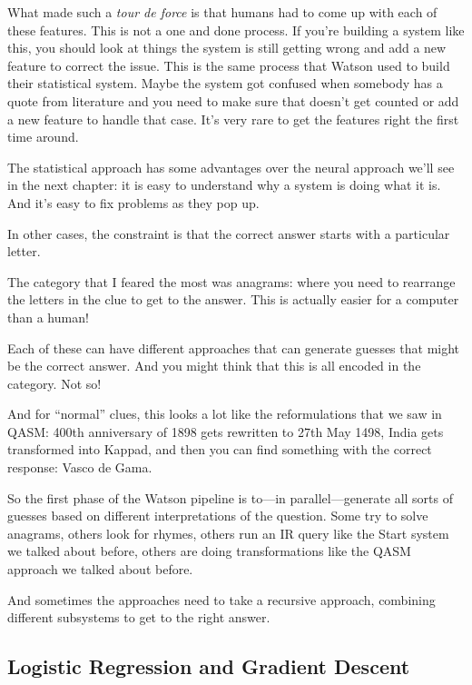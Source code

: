 What made \watson{} such a \textit{tour de force} is that humans had to come
up with each of these features.
%
This is not a one and done process.  If you're building a system like
this, you should look at things the system is still getting wrong and
add a new feature to correct the issue.  This is the same process that
Watson used to build their statistical system.  Maybe the system got
confused when somebody has a quote from literature and you need to
make sure that doesn’t get counted or add a new feature to handle that
case.  It’s very rare to get the features right the first time around.



The statistical approach has some advantages over the neural approach
we'll see in the next chapter: it is easy to understand why a system
is doing what it is.  And it's easy to fix problems as they pop up.


In other cases, the constraint is that the correct answer starts with a particular letter.  

The category that I feared the most was anagrams: where you need to rearrange the letters in the clue to get to the answer.  This is actually easier for a computer than a human!

Each of these can have different approaches that can generate guesses that
might be the correct answer.  And you might think that this is all encoded in
the category.  Not so!

And for “normal” clues, this looks a lot like the reformulations that we saw in QASM: 400th anniversary of 1898 gets rewritten to 27th May 1498, India gets transformed into Kappad, and then you can find something with the correct response: Vasco de Gama.

So the first phase of the Watson pipeline is to---in parallel---generate all
sorts of guesses based on different interpretations of the question.  Some try
to solve anagrams, others look for rhymes, others run an IR query like the
Start system we talked about before, others are doing transformations like the
QASM approach we talked about before.

And sometimes the approaches need to take a recursive approach, combining
different subsystems to get to the right answer.

\subsection{Logistic Regression and Gradient Descent}
\label{sec:watson:logistic-regression}

